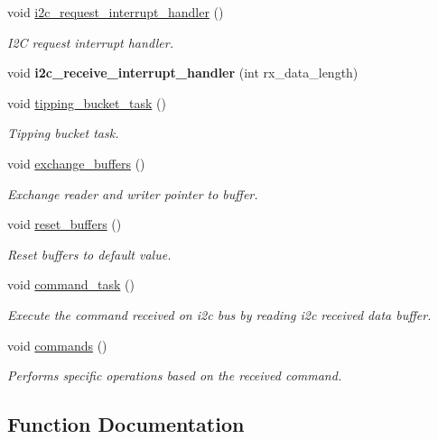 \begin{DoxyCompactItemize}
void \hyperlink{i2c-rain_8ino_ac816bd8aafe77e7a571574c8a26eead5}{i2c\+\_\+request\+\_\+interrupt\+\_\+handler} ()
\begin{DoxyCompactList}\small\item\em I2C request interrupt handler. \end{DoxyCompactList}\item 
\mbox{\label{i2c-rain_8ino_a6e27532df66f6bf186654355def5c9af}} 
void {\bfseries i2c\+\_\+receive\+\_\+interrupt\+\_\+handler} (int rx\+\_\+data\+\_\+length)
\item 
void \hyperlink{i2c-rain_8ino_a009edfb36e6432603ed0ede845e2c12d}{tipping\+\_\+bucket\+\_\+task} ()
\begin{DoxyCompactList}\small\item\em Tipping bucket task. \end{DoxyCompactList}\item 
void \hyperlink{i2c-rain_8ino_a46696a96b3118b5d8900703c054166c8}{exchange\+\_\+buffers} ()
\begin{DoxyCompactList}\small\item\em Exchange reader and writer pointer to buffer. \end{DoxyCompactList}\item 
void \hyperlink{i2c-rain_8ino_a07daf3835b622d4d3451690f603845c1}{reset\+\_\+buffers} ()
\begin{DoxyCompactList}\small\item\em Reset buffers to default value. \end{DoxyCompactList}\item 
void \hyperlink{i2c-rain_8ino_a42389aceb96a84573eb67e6d141cb594}{command\+\_\+task} ()
\begin{DoxyCompactList}\small\item\em Execute the command received on i2c bus by reading i2c received data buffer. \end{DoxyCompactList}\item 
void \hyperlink{i2c-rain_8ino_a4981066e183f1432ffd6eddf55826585}{commands} ()
\begin{DoxyCompactList}\small\item\em Performs specific operations based on the received command. \end{DoxyCompactList}\end{DoxyCompactItemize}


\subsection{Function Documentation}
\mbox{\label{i2c-rain_8ino_a42389aceb96a84573eb67e6d141cb594}} 
